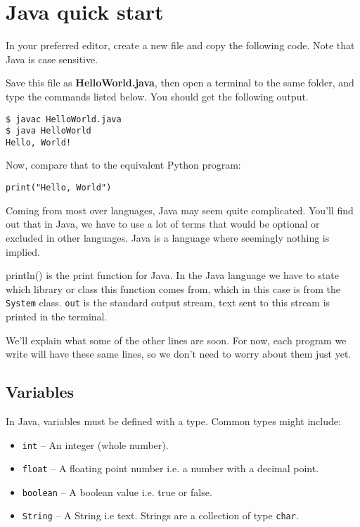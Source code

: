 \section{Java quick start}

	In your preferred editor, create a new file and copy the following code. Note that Java is case sensitive.
	
	
	
	Save this file as \textbf{HelloWorld.java}, then open a terminal to the same folder, and type the commands listed below. You should get the following output.
	
	\begin{lstlisting}[style=Terminal]
$ javac HelloWorld.java
$ java HelloWorld
Hello, World!
	\end{lstlisting}
	
	Now, compare that to the equivalent Python program:
	
	\begin{lstlisting}[style=Python]
print("Hello, World")
	\end{lstlisting}
	
	Coming from most over languages, Java may seem quite complicated. You'll find out that in Java, we have to use a lot of terms that would be optional or excluded in other languages. Java is a language where seemingly nothing is implied.
	
	\begin{aside}[println()]
		println() is the print function for Java. In the Java language we have to state which library or class this function comes from, which in this case is from the \texttt{System} class. \texttt{out} is the standard output stream, text sent to this stream is printed in the terminal.
	\end{aside}
	
	We'll explain what some of the other lines are soon. For now, each program we write will have these same lines, so we don't need to worry about them just yet.
	
	\subsection{Variables}
	
	In Java, variables must be defined with a type. Common types might include:
	
	\begin{itemize}[nosep]
		\item \texttt{int} -- An integer (whole number).
		\item \texttt{float} -- A floating point number i.e. a number with a decimal point.
		\item \texttt{boolean} -- A boolean value i.e. true or false.
		\item \texttt{String} -- A String i.e text. Strings are a collection of type \texttt{char}.
	\end{itemize}

